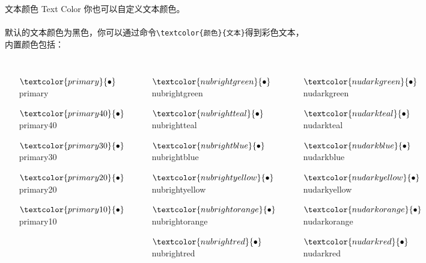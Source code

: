 \documentclass[10pt,aspectratio=169,fontset=none]{ctexbeamer}
\begin{document}
    \begin{frame}{文本颜色 Text Color}
        你也可以自定义文本颜色。
        \\ ~ \\
        默认的文本颜色为黑色，你可以通过命令\texttt{\textbackslash textcolor\{颜色\}\{文本\}}得到彩色文本，内置颜色包括：
        \begin{columns}
            \begin{itemize}
                \item[$\textcolor{primary}{\bullet}$] \textcolor{primary}{primary} 
                \item[$\textcolor{primary40}{\bullet}$] \textcolor{primary40}{primary40}
                \item[$\textcolor{primary30}{\bullet}$] \textcolor{primary30}{primary30}
                \item[$\textcolor{primary20}{\bullet}$] \textcolor{primary20}{primary20}
                \item[$\textcolor{primary10}{\bullet}$] \textcolor{primary10}{primary10}
            \end{itemize}
            \begin{itemize}
                \item[$\textcolor{nubrightgreen}{\bullet}$] \textcolor{nubrightgreen}{nubrightgreen}
                \item[$\textcolor{nubrightteal}{\bullet}$] \textcolor{nubrightteal}{nubrightteal}
                \item[$\textcolor{nubrightblue}{\bullet}$] \textcolor{nubrightblue}{nubrightblue}
                \item[$\textcolor{nubrightyellow}{\bullet}$] \textcolor{nubrightyellow}{nubrightyellow}
                \item[$\textcolor{nubrightorange}{\bullet}$] \textcolor{nubrightorange}{nubrightorange}
                \item[$\textcolor{nubrightred}{\bullet}$] \textcolor{nubrightred}{nubrightred}
            \end{itemize}
            \begin{itemize}
                \item[$\textcolor{nudarkgreen}{\bullet}$] \textcolor{nudarkgreen}{nudarkgreen}
                \item[$\textcolor{nudarkteal}{\bullet}$] \textcolor{nudarkteal}{nudarkteal}
                \item[$\textcolor{nudarkblue}{\bullet}$] \textcolor{nudarkblue}{nudarkblue}
                \item[$\textcolor{nudarkyellow}{\bullet}$] \textcolor{nudarkyellow}{nudarkyellow}
                \item[$\textcolor{nudarkorange}{\bullet}$] \textcolor{nudarkorange}{nudarkorange}
                \item[$\textcolor{nudarkred}{\bullet}$] \textcolor{nudarkred}{nudarkred}
            \end{itemize}
        \end{columns}
    \end{frame}
\end{document}
